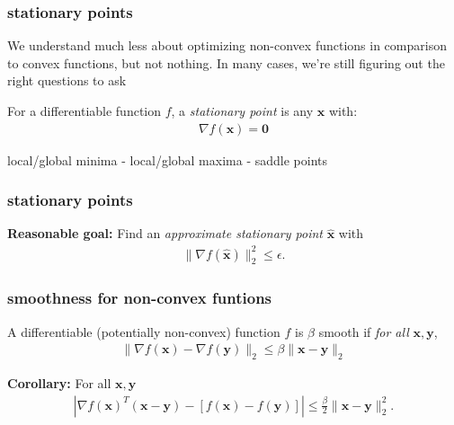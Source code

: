 \documentclass[compress]{beamer}
\newcommand{\bv}[1]{\mathbf{#1}}
\begin{document}
\begin{frame}[t]
	\frametitle{stationary points}
	We understand much less about optimizing non-convex functions in comparison to convex functions, but not nothing. In many cases, we're still figuring out the right questions to ask
	\begin{definition}
		For a differentiable function $f$, a \emph{stationary point} is any $\bv{x}$ with: 
		\begin{align*}
		\nabla f(\bv{x}) = \bv{0}
		\end{align*}
	\end{definition}
	\begin{center}
		local/global minima - local/global maxima - saddle points
	\end{center}
\end{frame}

\begin{frame}[t]
	\frametitle{stationary points}
	\textbf{Reasonable goal:} Find an \emph{approximate stationary point} $\hat{\bv{x}}$ with
	\begin{align*}
		\|\nabla f(\hat{\bv{x}})\|_2^2 \leq \epsilon.
	\end{align*}
\end{frame}

\begin{frame}[t]
	\frametitle{smoothness for non-convex funtions}
	\begin{definition}
		A differentiable (potentially non-convex) function $f$ is $\beta$ smooth if \emph{for all} $\bv{x}, \bv{y}$, 
		\begin{align*}
		\|\nabla f(\bv{x}) - \nabla f(\bv{y})\|_2 \leq \beta \|\bv{x} - \bv{y}\|_2
		\end{align*}
	\end{definition}
	\textbf{Corollary:} For all $\bv{x}, \bv{y}$
	\begin{align*}
	\left | \nabla f(\bv{x})^T(\bv{x} - \bv{y}) - [f(\bv{x}) - f(\bv{y})] \right| \leq \frac{\beta}{2} \|\bv{x} - \bv{y}\|_2^2.
	\end{align*}
\end{frame}
\end{document}
